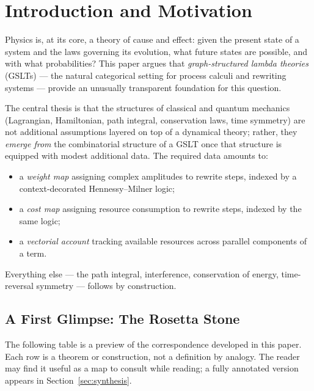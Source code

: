 \chapter{Introduction and Motivation}

Physics is, at its core, a theory of cause and effect: given the present state
of a system and the laws governing its evolution, what future states are
possible, and with what probabilities?  This paper argues that
\emph{graph-structured lambda theories} (GSLTs) --- the natural categorical
setting for process calculi and rewriting systems --- provide an unusually
transparent foundation for this question.

The central thesis is that the structures of classical and quantum mechanics
(Lagrangian, Hamiltonian, path integral, conservation laws, time symmetry) are
not additional assumptions layered on top of a dynamical theory; rather, they
\emph{emerge from} the combinatorial structure of a GSLT once that structure is
equipped with modest additional data.  The required data amounts to:

\begin{itemize}[itemsep=2pt]
  \item a \emph{weight map} assigning complex amplitudes to rewrite steps,
        indexed by a context-decorated Hennessy--Milner logic;
  \item a \emph{cost map} assigning resource consumption to rewrite steps,
        indexed by the same logic;
  \item a \emph{vectorial account} tracking available resources across
        parallel components of a term.
\end{itemize}

Everything else --- the path integral, interference, conservation of energy,
time-reversal symmetry --- follows by construction.

\section{A First Glimpse: The Rosetta Stone}

The following table is a preview of the correspondence developed in this paper.
Each row is a theorem or construction, not a definition by analogy.
The reader may find it useful as a map to consult while reading;
a fully annotated version appears in Section~\ref{sec:synthesis}.

